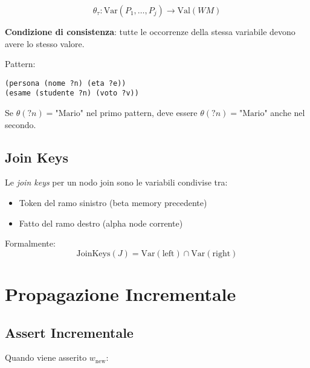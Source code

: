 \begin{equation}
\theta_\tau: \text{Var}(P_1, \ldots, P_j) \to \text{Val}(WM)
\end{equation}

\textbf{Condizione di consistenza}: tutte le occorrenze della stessa variabile devono avere lo stesso valore.

\begin{esempio}
Pattern:
\begin{lstlisting}[language=CLIPS]
(persona (nome ?n) (eta ?e))
(esame (studente ?n) (voto ?v))
\end{lstlisting}

Se $\theta(?n) = \text{"Mario"}$ nel primo pattern, deve essere $\theta(?n) = \text{"Mario"}$ anche nel secondo.
\end{esempio}

\subsection{Join Keys}

\begin{definizione}
Le \textit{join keys} per un nodo join sono le variabili condivise tra:
\begin{itemize}
\item Token del ramo sinistro (beta memory precedente)
\item Fatto del ramo destro (alpha node corrente)
\end{itemize}
\end{definizione}

Formalmente:
\begin{equation}
\text{JoinKeys}(J) = \text{Var}(\text{left}) \cap \text{Var}(\text{right})
\end{equation}

\section{Propagazione Incrementale}

\subsection{Assert Incrementale}

Quando viene asserito $w_{\text{new}}$:


